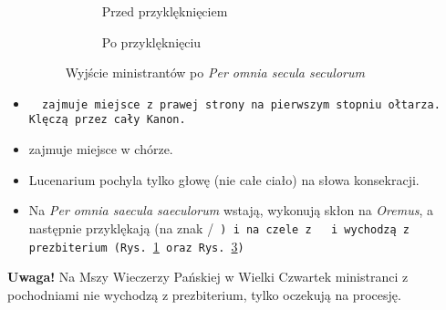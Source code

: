 \begin{itemize}
\begin{figure}[ht]
		      \begin{subfigure}[t]{.5\linewidth}
			      \centering{}%
			      \caption{Przed przyklęknięciem}
			      \label{fig:wyjscie_1}
		      \end{subfigure}\qquad
		      \begin{subfigure}[t]{.5\linewidth}
			      \centering\usebox{\imagebox}
			      \caption{Po przyklęknięciu}
			      \label{fig:wyjscie_2}
		      \end{subfigure}
		      \caption{Wyjście ministrantów po \textit{Per omnia secula seculorum}}
	      \end{figure}
	\item \tt~ zajmuje miejsce z prawej strony na pierwszym stopniu ołtarza.
	      Klęczą przez cały Kanon.
	\item {} zajmuje miejsce w chórze.
	\item Lucenarium pochyla tylko głowę (nie całe ciało) na słowa konsekracji.
	\item Na \textit{Per omnia saecula saeculorum} wstają, wykonują skłon na
	      \textit{Oremus}, a następnie przyklękają (na znak \big/\tt~) i na
	      czele z \tt~ i  wychodzą z prezbiterium (Rys. \ref{fig:wyjscie_1}
	      oraz Rys. \ref{fig:wyjscie_2})
\end{itemize}

\textbf{Uwaga!} Na Mszy Wieczerzy Pańskiej w Wielki Czwartek ministranci z
pochodniami nie wychodzą z prezbiterium, tylko oczekują na procesję.